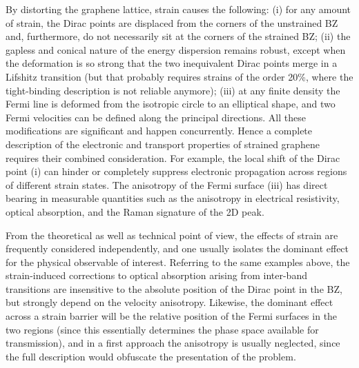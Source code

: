 By distorting the graphene lattice, strain causes the following\cite{Pereira2009}:
(i) for any amount of strain, the Dirac points are displaced from the corners of the unstrained BZ and, furthermore, do not necessarily sit at the corners of the strained BZ;
(ii) the gapless and conical nature of the energy dispersion remains robust, except when the deformation is so strong that the two inequivalent Dirac points merge in a Lifshitz transition (but that probably requires strains of the order 20\%, where the tight-binding description is not reliable anymore);
(iii) at any finite density the Fermi line is deformed from the isotropic circle to an elliptical shape, and two Fermi velocities can be defined along the principal directions\cite{Pereira2009,Pereira2010c,Choi2010}.
All these modifications are significant and happen concurrently. 
Hence a complete description of the electronic and transport properties of strained graphene requires their combined consideration.
For example, the local shift of the Dirac point (i) can hinder or completely suppress electronic propagation across regions of different strain states\cite{Pereira2009a,Fogler2008}.
The anisotropy of the Fermi surface (iii) has direct bearing in measurable quantities such as the anisotropy in electrical resistivity\cite{Kim2009}, optical absorption\cite{Pereira2010c,Pellegrino2010}, and the Raman signature of the 2D peak\cite{Huang2010,Mohr2010a,Frank2011,Yoon2011}.

From the theoretical as well as technical point of view, the effects of strain are frequently considered independently, and one usually isolates the dominant effect for the physical observable of interest.
Referring to the same examples above, the strain-induced corrections to optical absorption arising from inter-band transitions are insensitive to the absolute position of the Dirac point in the BZ, but strongly depend on the velocity anisotropy\cite{Pereira2010c,Pellegrino2010}.
Likewise, the dominant effect across a strain barrier will be the relative position of the Fermi surfaces in the two regions (since this essentially determines the phase space available for transmission), and in a first approach the anisotropy is usually neglected\cite{Fogler2008,Pereira2009a}, since the full description would obfuscate the presentation of the problem.

